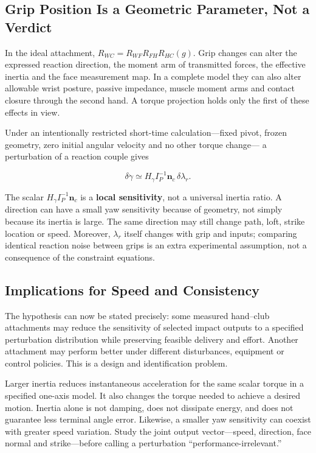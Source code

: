 \documentclass[
  11pt,
]{article}
\begin{document}
\subsection{Grip Position Is a Geometric Parameter, Not a
Verdict}\label{grip-position-is-a-geometric-parameter-not-a-verdict}

In the ideal attachment, \(R_{WC}=R_{WF}R_{FH}R_{HC}(g)\). Grip changes
can alter the expressed reaction direction, the moment arm of
transmitted forces, the effective inertia and the face measurement map.
In a complete model they can also alter allowable wrist posture, passive
impedance, muscle moment arms and contact closure through the second
hand. A torque projection holds only the first of these effects in view.

Under an intentionally restricted short-time calculation---fixed pivot,
frozen geometry, zero initial angular velocity and no other torque
change--- a perturbation of a reaction couple gives

\[
\delta\ddot\gamma
\simeq H_\gamma I_P^{-1}\mathbf n_c\,\delta\lambda_r.
\]

The scalar \(H_\gamma I_P^{-1}\mathbf n_c\) is a \textbf{local
sensitivity}, not a universal inertia ratio. A direction can have a
small yaw sensitivity because of geometry, not simply because its
inertia is large. The same direction may still change path, loft, strike
location or speed. Moreover, \(\lambda_r\) itself changes with grip and
inputs; comparing identical reaction noise between grips is an extra
experimental assumption, not a consequence of the constraint equations.

\subsection{Implications for Speed and
Consistency}\label{implications-for-speed-and-consistency}

The hypothesis can now be stated precisely: some measured hand--club
attachments may reduce the sensitivity of selected impact outputs to a
specified perturbation distribution while preserving feasible delivery
and effort. Another attachment may perform better under different
disturbances, equipment or control policies. This is a design and
identification problem.

Larger inertia reduces instantaneous acceleration for the same scalar
torque in a specified one-axis model. It also changes the torque needed
to achieve a desired motion. Inertia alone is not damping, does not
dissipate energy, and does not guarantee less terminal angle error.
Likewise, a smaller yaw sensitivity can coexist with greater speed
variation. Study the joint output vector---speed, direction, face normal
and strike---before calling a perturbation ``performance-irrelevant.''
\end{document}
